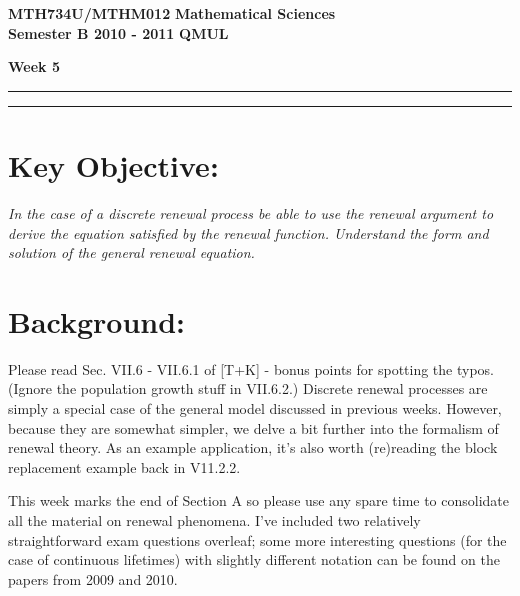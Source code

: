 \documentclass[11pt,a4paper]{article}
\begin{document}
  \textbf{MTH734U/MTHM012} \hfill \textbf{Mathematical Sciences}\\
  \textbf{Semester B 2010 - 2011} \hfill \textbf{QMUL}
  \begin{center}
    \textbf{\huge Week 5}
  \end{center}
  \hrule \vspace{2mm} \hrule
  \section*{Key Objective:}
  \textit{In the case of a discrete renewal process be able to use the renewal argument to derive the equation satisfied by the renewal function. Understand the form and solution of the general renewal equation.}
  
  \section*{Background:}
  Please read Sec. VII.6 - VII.6.1 of [T+K] - bonus points for spotting the typos. (Ignore the population growth stuff in VII.6.2.) Discrete renewal processes are simply a special case of the general model discussed in previous weeks. However, because they are somewhat simpler, we delve a bit further into the formalism of renewal theory. As an example application, it's also worth (re)reading the block replacement example back in V11.2.2.\par
  This week marks the end of Section A so please use any spare time to consolidate all the material on renewal phenomena. I've included two relatively straightforward exam questions overleaf; some more interesting questions (for the case of continuous lifetimes) with slightly different notation can be found on the papers from 2009 and 2010.
\end{document}
